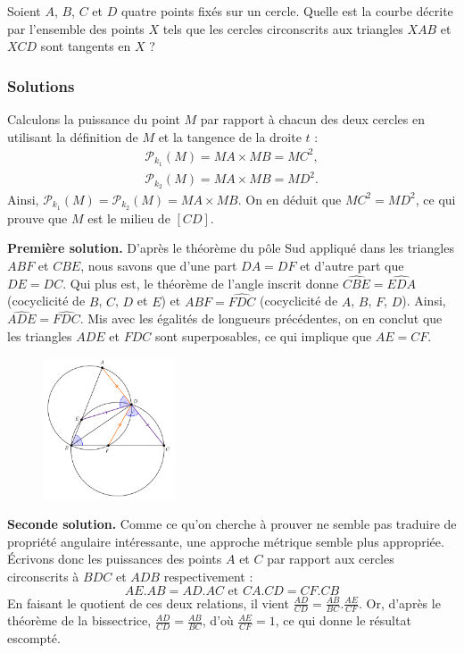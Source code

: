 \begin{exo}
Soient $A$, $B$, $C$ et $D$ quatre points fixés sur un cercle. Quelle est la courbe décrite par l'ensemble des points $X$ tels que les cercles circonscrits aux triangles $XAB$ et $XCD$ sont tangents en $X$ ?
\end{exo}


\subsubsection{Solutions}


\begin{sol}
Calculons la puissance du point $M$ par rapport à chacun des deux cercles en utilisant la définition de $M$ et la tangence de la droite $t$ :
\begin{gather*}
    \mathcal{P}_{k_1}(M) = MA \times MB = MC^2, \\
    \mathcal{P}_{k_2}(M) = MA \times MB = MD^2.
\end{gather*}
Ainsi, $\mathcal{P}_{k_1}(M) = \mathcal{P}_{k_2}(M) = MA \times MB$. On en déduit que $MC^2 = MD^2$, ce qui prouve que $M$ est le milieu de $[CD]$.
\end{sol}


\begin{sol}
\textbf{Première solution.} D'après le théorème du pôle Sud appliqué dans les triangles $ABF$ et $CBE$, nous savons que d'une part $DA=DF$ et d'autre part que $DE=DC$. Qui plus est, le théorème de l'angle inscrit donne $\widehat{CBE}=\widehat{EDA}$ (cocyclicité de $B$, $C$, $D$ et $E$) et $\widehat{ABF}=\widehat{FDC}$ (cocyclicité de $A$, $B$, $F$, $D$). Ainsi, $\widehat{ADE}=\widehat{FDC}$. Mis avec les égalités de longueurs précédentes, on en conclut que les triangles $ADE$ et $FDC$ sont superposables, ce qui implique que $AE=CF$.

\begin{figure}[!h]
\centerline{\includegraphics[width=0.35\textwidth]{pied_bissectrice}}
\end{figure}

\textbf{Seconde solution.} Comme ce qu'on cherche à prouver ne semble pas traduire de propriété angulaire intéressante, une approche métrique semble plus appropriée. Écrivons donc les puissances des points $A$ et $C$ par rapport aux cercles circonscrits à $BDC$ et $ADB$ respectivement :
\[ AE.AB = AD.AC \text{\ \ \ et\ \ \ } CA.CD = CF.CB \]
En faisant le quotient de ces deux relations, il vient $\frac{AD}{CD} = \frac{AB}{BC}.\frac{AE}{CF}$. Or, d'après le théorème de la bissectrice, $\frac{AD}{CD} = \frac{AB}{BC}$, d'où $\frac{AE}{CF}=1$, ce qui donne le résultat escompté.
\end{sol}


